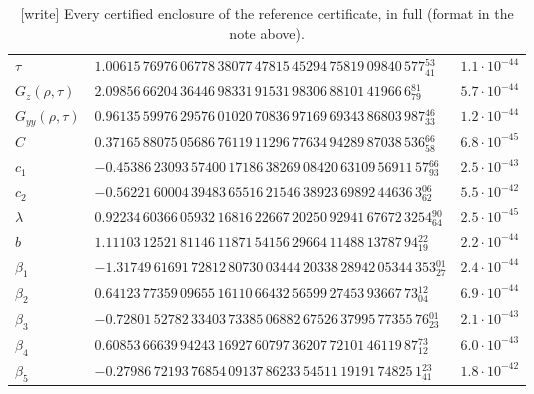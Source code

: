 \documentclass[11pt]{article}
\theoremstyle{definition}\newtheorem{definition}[theorem]{Definition}
\theoremstyle{remark}\newtheorem{remark}[theorem]{Remark}
\begin{document}
\begin{table}[htbp]
\begin{tabular}{@{}lll@{}}
$\tau$ & $1.00615\,76976\,06778\,38077\,47815\,45294\,75819\,09840\,577{}^{53}_{41}$ & $1.1\cdot10^{-44}$\\
$G_z(\rho,\tau)$ & $2.09856\,66204\,36446\,98331\,91531\,98306\,88101\,41966\,6{}^{81}_{79}$ & $5.7\cdot10^{-44}$\\
$G_{yy}(\rho,\tau)$ & $0.96135\,59976\,29576\,01020\,70836\,97169\,69343\,86803\,987{}^{46}_{33}$ & $1.2\cdot10^{-44}$\\
$C$ & $0.37165\,88075\,05686\,76119\,11296\,77634\,94289\,87038\,536{}^{66}_{58}$ & $6.8\cdot10^{-45}$\\
$c_1$ & $-0.45386\,23093\,57400\,17186\,38269\,08420\,63109\,56911\,57{}^{66}_{93}$ & $2.5\cdot10^{-43}$\\
$c_2$ & $-0.56221\,60004\,39483\,65516\,21546\,38923\,69892\,44636\,3{}^{06}_{62}$ & $5.5\cdot10^{-42}$\\
$\lambda$ & $0.92234\,60366\,05932\,16816\,22667\,20250\,92941\,67672\,3254{}^{90}_{64}$ & $2.5\cdot10^{-45}$\\
$b$ & $1.11103\,12521\,81146\,11871\,54156\,29664\,11488\,13787\,94{}^{22}_{19}$ & $2.2\cdot10^{-44}$\\
$\beta_1$ & $-1.31749\,61691\,72812\,80730\,03444\,20338\,28942\,05344\,353{}^{01}_{27}$ & $2.4\cdot10^{-44}$\\
$\beta_2$ & $0.64123\,77359\,09655\,16110\,66432\,56599\,27453\,93667\,73{}^{12}_{04}$ & $6.9\cdot10^{-44}$\\
$\beta_3$ & $-0.72801\,52782\,33403\,73385\,06882\,67526\,37995\,77355\,76{}^{01}_{23}$ & $2.1\cdot10^{-43}$\\
$\beta_4$ & $0.60853\,66639\,94243\,16927\,60797\,36207\,72101\,46119\,87{}^{73}_{12}$ & $6.0\cdot10^{-43}$\\
$\beta_5$ & $-0.27986\,72193\,76854\,09137\,86233\,54511\,19191\,74825\,1{}^{23}_{41}$ & $1.8\cdot10^{-42}$\\
\bottomrule\end{tabular}
\caption{\textsf{[write]} Every certified enclosure of the reference
certificate, in full (format in the note above).}
\label{bit:cert:tab:full}
\end{table}
\end{document}
